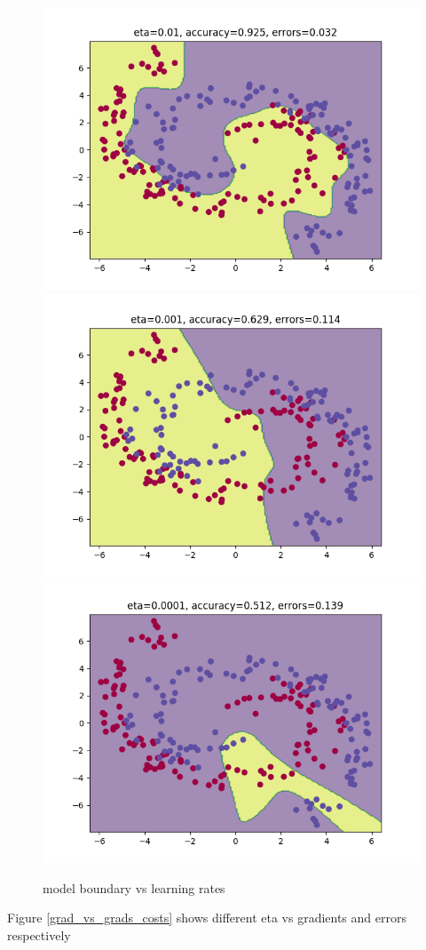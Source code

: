 \documentclass[11pt]{article}
\begin{document}
\begin{figure}[H]
	\includegraphics[scale=0.5]{images/NN_boundary_vs_learning_rates/2}
	\includegraphics[scale=0.5]{images/NN_boundary_vs_learning_rates/3}
	\centering
	\includegraphics[scale=0.5]{images/NN_boundary_vs_learning_rates/4}
	\caption{model boundary vs learning rates}
	\label{fig: learning_rate_boundary}

\end{figure}
Figure \ref{grad_vs_grads_costs} shows different eta vs gradients and errors respectively
\end{document}
